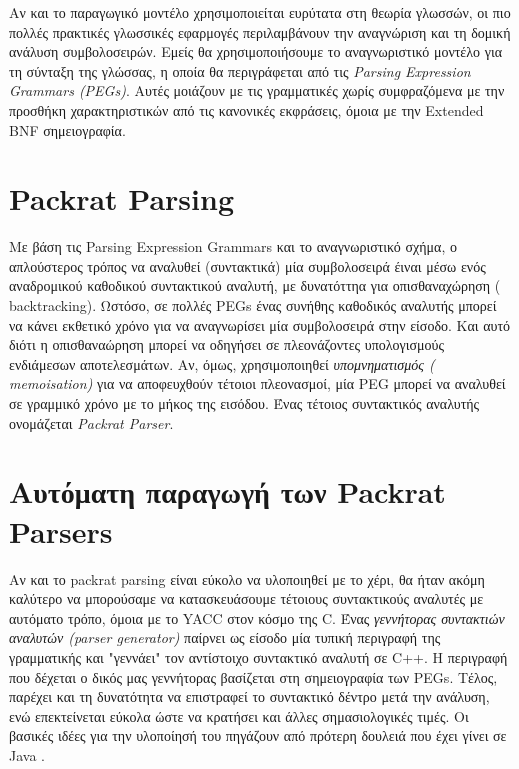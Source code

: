\documentclass[diploma]{softlab-thesis}
\begin{document}
  Αν και το παραγωγικό μοντέλο χρησιμοποιείται ευρύτατα στη θεωρία γλωσσών, οι πιο πολλές πρακτικές γλωσσικές εφαρμογές περιλαμβάνουν την αναγνώριση και τη δομική ανάλυση συμβολοσειρών. 
Εμείς θα χρησιμοποιήσουμε το αναγνωριστικό μοντέλο για τη σύνταξη της γλώσσας, η οποία θα περιγράφεται από τις  \textit{Parsing Expression Grammars (PEGs)}. Αυτές μοιάζουν με τις γραμματικές χωρίς συμφραζόμενα με την προσθήκη χαρακτηριστικών από τις κανονικές εκφράσεις, όμοια με την  Extended BNF σημειογραφία.

\section{ Packrat Parsing}
Με βάση τις Parsing Expression Grammars και το αναγνωριστικό σχήμα, ο απλούστερος τρόπος να αναλυθεί (συντακτικά) μία συμβολοσειρά έιναι μέσω ενός αναδρομικού καθοδικού συντακτικού αναλυτή, με δυνατόττηα για οπισθαναχώρηση ( backtracking). 
Ωστόσο, σε πολλές  PEGs  ένας συνήθης καθοδικός αναλυτής μπορεί να κάνει εκθετικό χρόνο για να αναγνωρίσει μία συμβολοσειρά στην είσοδο. 
Και αυτό διότι η οπισθαναώρηση μπορεί να οδηγήσει σε πλεονάζοντες υπολογισμούς ενδιάμεσων αποτελεσμάτων.
Αν, όμως, χρησιμοποιηθεί \textit{ υπομνηματισμός ( memoisation)} για να αποφευχθούν τέτοιοι πλεονασμοί, μία  PEG  μπορεί να αναλυθεί σε γραμμικό χρόνο με το μήκος της εισόδου.
Ένας τέτοιος συντακτικός αναλυτής ονομάζεται \textit{Packrat Parser}.

\section{ Αυτόματη παραγωγή των  Packrat Parsers}
Αν και το  packrat parsing είναι εύκολο να υλοποιηθεί με το χέρι, θα ήταν ακόμη καλύτερο να μπορούσαμε να κατασκευάσουμε τέτοιους συντακτικούς αναλυτές με αυτόματο τρόπο, όμοια με το  YACC  στον κόσμο της C. 
Ένας \textit{γεννήτορας συντακτιών αναλυτών (parser generator)} παίρνει ως είσοδο μία τυπική περιγραφή της γραμματικής και "γεννάει" τον αντίστοιχο συντακτικό αναλυτή  σε  C++.
Η περιγραφή που δέχεται ο δικός μας γεννήτορας βασίζεται στη σημειογραφία των  PEGs. 
Τέλος, παρέχει και τη δυνατότητα να επιστραφεί το συντακτικό δέντρο μετά την ανάλυση, ενώ επεκτείνεται εύκολα ώστε να κρατήσει και άλλες σημασιολογικές τιμές.
Οι βασικές ιδέες για την υλοποίησή του πηγάζουν από πρότερη δουλειά που έχει γίνει σε  Java \cite{fowler} \cite{lgi}.
\end{document}
